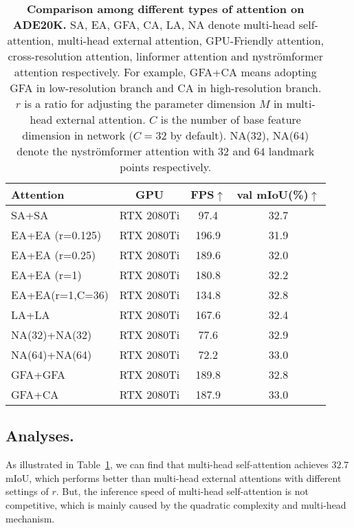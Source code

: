 \documentclass{article}
\begin{document}
\begin{table}[t]
	\begin{center}
        \caption{\textbf{Comparison among different types of attention on ADE20K.} SA, EA, GFA, CA, LA, NA denote multi-head self-attention, multi-head external attention, GPU-Friendly attention, cross-resolution attention, linformer attention and nystr{\"o}mformer attention respectively. For example, GFA+CA means adopting GFA in low-resolution branch and CA in high-resolution branch. $r$ is a ratio for adjusting the parameter dimension $M$ in multi-head external attention. $C$ is the number of base feature dimension in network ($C=32$ by default). NA($32$), NA($64$) denote the nystr{\"o}mformer attention with $32$ and $64$ landmark points respectively.}
        \setlength{\tabcolsep}{1mm}
        \centering
        \begin{tabular}{l|c|c|c}
        \toprule
            Attention
            &GPU
&FPS$\uparrow$
            &val mIoU(\%)$\uparrow$ \\
            \midrule
            SA+SA &RTX 2080Ti &97.4 &32.7\\
            EA+EA (r=0.125) &RTX 2080Ti &196.9 &31.9\\
            EA+EA (r=0.25) &RTX 2080Ti &189.6 &32.0\\
            EA+EA (r=1) &RTX 2080Ti &180.8 &32.2\\
            EA+EA(r=1,C=36)	&RTX 2080Ti	&134.8 &32.8\\
            LA+LA &RTX 2080Ti &167.6 &32.4\\
            NA(32)+NA(32) &RTX 2080Ti &77.6 &32.9\\
            NA(64)+NA(64) &RTX 2080Ti &72.2 &33.0\\
            GFA+GFA &RTX 2080Ti &189.8 &32.8\\
            GFA+CA &RTX 2080Ti &187.9 &33.0\\
        \bottomrule
        \end{tabular}
		\label{supp-tab:ablation-attention}
	\end{center}
\end{table}

\subsection{Analyses.}

As illustrated in Table~\ref{supp-tab:ablation-attention}, we can find that multi-head self-attention achieves $32.7$ mIoU, which performs better than multi-head external attentions with different settings of $r$. But, the inference speed of multi-head self-attention is not competitive, which is mainly caused by the quadratic complexity and multi-head mechanism.
\end{document}
